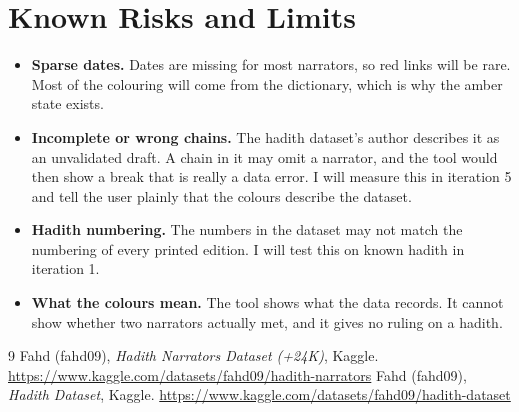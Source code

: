 \documentclass[11pt,a4paper]{article}
\begin{document}
\section{Known Risks and Limits}
\begin{itemize}
  \item \textbf{Sparse dates.} Dates are missing for most narrators, so red links will be rare. Most of the colouring will come from the dictionary, which is why the amber state exists.
  \item \textbf{Incomplete or wrong chains.} The hadith dataset's author describes it as an unvalidated draft. A chain in it may omit a narrator, and the tool would then show a break that is really a data error. I will measure this in iteration 5 and tell the user plainly that the colours describe the dataset.
  \item \textbf{Hadith numbering.} The numbers in the dataset may not match the numbering of every printed edition. I will test this on known hadith in iteration 1.
  \item \textbf{What the colours mean.} The tool shows what the data records. It cannot show whether two narrators actually met, and it gives no ruling on a hadith.
\end{itemize}

\begin{thebibliography}{9}
 Fahd (fahd09), \emph{Hadith Narrators Dataset (+24K)}, Kaggle. \url{https://www.kaggle.com/datasets/fahd09/hadith-narrators}
 Fahd (fahd09), \emph{Hadith Dataset}, Kaggle. \url{https://www.kaggle.com/datasets/fahd09/hadith-dataset}
\end{thebibliography}
\end{document}
